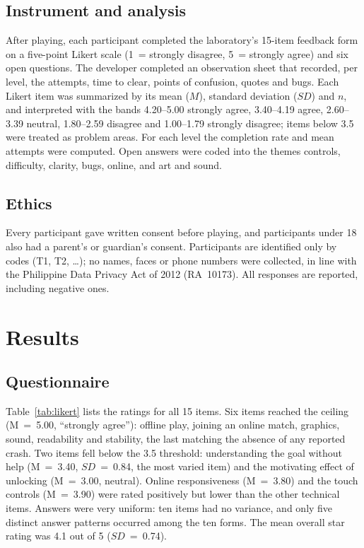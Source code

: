 \documentclass[conference]{IEEEtran}
\begin{document}
\subsection{Instrument and analysis}
After playing, each participant completed the laboratory's 15-item feedback form on a five-point Likert scale (1~= strongly disagree, 5~= strongly agree) and six open questions. The developer completed an observation sheet that recorded, per level, the attempts, time to clear, points of confusion, quotes and bugs. Each Likert item was summarized by its mean ($M$), standard deviation ($SD$) and $n$, and interpreted with the bands 4.20--5.00 strongly agree, 3.40--4.19 agree, 2.60--3.39 neutral, 1.80--2.59 disagree and 1.00--1.79 strongly disagree; items below 3.5 were treated as problem areas. For each level the completion rate and mean attempts were computed. Open answers were coded into the themes controls, difficulty, clarity, bugs, online, and art and sound.

\subsection{Ethics}
Every participant gave written consent before playing, and participants under 18 also had a parent's or guardian's consent. Participants are identified only by codes (T1, T2, \ldots); no names, faces or phone numbers were collected, in line with the Philippine Data Privacy Act of 2012 (RA~10173). All responses are reported, including negative ones.

\section{Results}
\subsection{Questionnaire}
Table~\ref{tab:likert} lists the ratings for all 15 items. Six items reached the ceiling (M~=~5.00, ``strongly agree''): offline play, joining an online match, graphics, sound, readability and stability, the last matching the absence of any reported crash. Two items fell below the 3.5 threshold: understanding the goal without help (M~=~3.40, $SD$~=~0.84, the most varied item) and the motivating effect of unlocking (M~=~3.00, neutral). Online responsiveness (M~=~3.80) and the touch controls (M~=~3.90) were rated positively but lower than the other technical items. Answers were very uniform: ten items had no variance, and only five distinct answer patterns occurred among the ten forms. The mean overall star rating was 4.1 out of 5 ($SD$~=~0.74).
\end{document}
